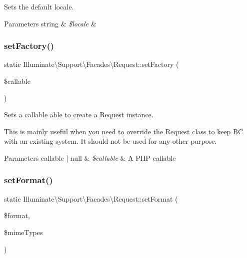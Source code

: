Sets the default locale.


\begin{DoxyParams}[1]{Parameters}
string & {\em \$locale} & \\
\hline
\end{DoxyParams}
\mbox{\label{class_illuminate_1_1_support_1_1_facades_1_1_request_a223c49b4b59ee06341172efbd2362139}} 
\subsubsection{\texorpdfstring{set\+Factory()}{setFactory()}}
{\footnotesize\ttfamily static Illuminate\textbackslash{}\+Support\textbackslash{}\+Facades\textbackslash{}\+Request\+::set\+Factory (\begin{DoxyParamCaption}\item[{}]{\$callable }\end{DoxyParamCaption})\hspace{0.3cm}{\ttfamily [static]}}

Sets a callable able to create a \mbox{\hyperlink{class_illuminate_1_1_support_1_1_facades_1_1_request}{Request}} instance.

This is mainly useful when you need to override the \mbox{\hyperlink{class_illuminate_1_1_support_1_1_facades_1_1_request}{Request}} class to keep BC with an existing system. It should not be used for any other purpose.


\begin{DoxyParams}[1]{Parameters}
callable | null & {\em \$callable} & A P\+HP callable \\
\hline
\end{DoxyParams}
\mbox{\label{class_illuminate_1_1_support_1_1_facades_1_1_request_a87d801fec0dde744cad4df68ddcca2e6}} 
\subsubsection{\texorpdfstring{set\+Format()}{setFormat()}}
{\footnotesize\ttfamily static Illuminate\textbackslash{}\+Support\textbackslash{}\+Facades\textbackslash{}\+Request\+::set\+Format (\begin{DoxyParamCaption}\item[{}]{\$format,  }\item[{}]{\$mime\+Types }\end{DoxyParamCaption})\hspace{0.3cm}{\ttfamily [static]}}

